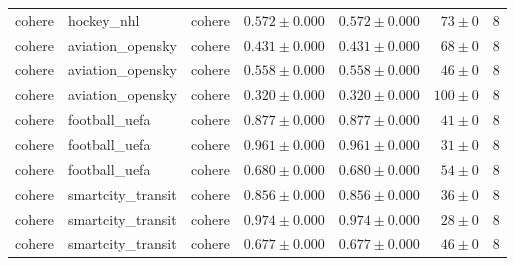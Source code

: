 \begin{table}[htbp]
\begin{tabular}{l l l r r r r}
cohere & hockey\_nhl & cohere & $0.572\pm0.000$ & $0.572\pm0.000$ & $73\pm0$ & 8 \\
cohere & aviation\_opensky & cohere & $0.431\pm0.000$ & $0.431\pm0.000$ & $68\pm0$ & 8 \\
cohere & aviation\_opensky & cohere & $0.558\pm0.000$ & $0.558\pm0.000$ & $46\pm0$ & 8 \\
cohere & aviation\_opensky & cohere & $0.320\pm0.000$ & $0.320\pm0.000$ & $100\pm0$ & 8 \\
cohere & football\_uefa & cohere & $0.877\pm0.000$ & $0.877\pm0.000$ & $41\pm0$ & 8 \\
cohere & football\_uefa & cohere & $0.961\pm0.000$ & $0.961\pm0.000$ & $31\pm0$ & 8 \\
cohere & football\_uefa & cohere & $0.680\pm0.000$ & $0.680\pm0.000$ & $54\pm0$ & 8 \\
cohere & smartcity\_transit & cohere & $0.856\pm0.000$ & $0.856\pm0.000$ & $36\pm0$ & 8 \\
cohere & smartcity\_transit & cohere & $0.974\pm0.000$ & $0.974\pm0.000$ & $28\pm0$ & 8 \\
cohere & smartcity\_transit & cohere & $0.677\pm0.000$ & $0.677\pm0.000$ & $46\pm0$ & 8 \\
\hline
\end{tabular}
\end{table}
